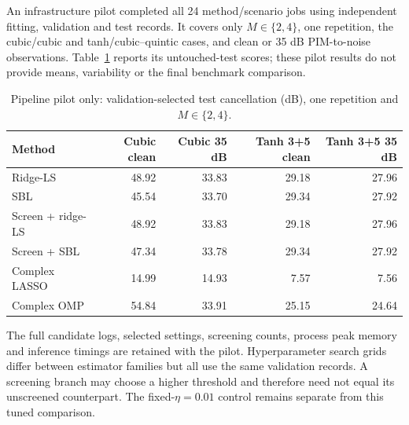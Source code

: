An infrastructure pilot completed all 24 method/scenario jobs using independent fitting, validation and test records. It covers only $M\in\{2,4\}$, one repetition, the cubic/cubic and tanh/cubic--quintic cases, and clean or 35 dB PIM-to-noise observations. Table~\ref{tab:pilot} reports its untouched-test scores; these pilot results do not provide means, variability or the final benchmark comparison.
\begin{table}[!t]
\caption{Pipeline pilot only: validation-selected test cancellation (dB), one repetition and $M\in\{2,4\}$.}
\label{tab:pilot}\centering\small
\begin{tabular}{lrrrr}\toprule
Method & Cubic clean & Cubic 35 dB & Tanh 3+5 clean & Tanh 3+5 35 dB\\\midrule
Ridge-LS & 48.92 & 33.83 & 29.18 & 27.96\\
SBL & 45.54 & 33.70 & 29.34 & 27.92\\
Screen + ridge-LS & 48.92 & 33.83 & 29.18 & 27.96\\
Screen + SBL & 47.34 & 33.78 & 29.34 & 27.92\\
Complex LASSO & 14.99 & 14.93 & 7.57 & 7.56\\
Complex OMP & 54.84 & 33.91 & 25.15 & 24.64\\
\bottomrule\end{tabular}\end{table}
The full candidate logs, selected settings, screening counts, process peak memory and inference timings are retained with the pilot. Hyperparameter search grids differ between estimator families but all use the same validation records. A screening branch may choose a higher threshold and therefore need not equal its unscreened counterpart. The fixed-$\eta=0.01$ control remains separate from this tuned comparison.
